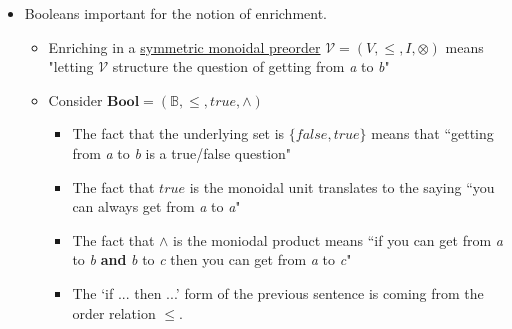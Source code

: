 \begin{itemize}
    \item Booleans important for the notion of enrichment.
          \begin{itemize}
            \item Enriching in a \hyperref[D2.2]{symmetric monoidal preorder} $\mathcal{V}=(V,\leq,I,\otimes)$ means "letting $\mathcal{V}$ structure the question of getting from \emph{a} to \emph{b}"
            \item Consider $\mathbf{Bool}=(\mathbb{B},\leq,true,\land)$
                  \begin{itemize}
                    \item The fact that the underlying set is $\{false, true\}$ means that ``getting from \emph{a} to \emph{b} is a true/false question"
                    \item The fact that $true$ is the monoidal unit translates to the saying ``you can always get from \emph{a} to \emph{a}"
                    \item The fact that $\land$ is the moniodal product means ``if you can get from \emph{a} to \emph{b} \textbf{and} \emph{b} to \emph{c} then you can get from \emph{a} to \emph{c}"
                    \item The `if ... then ...' form of the previous sentence is coming from the order relation $\leq$.    \end{itemize}

          \end{itemize}
  \end{itemize}
